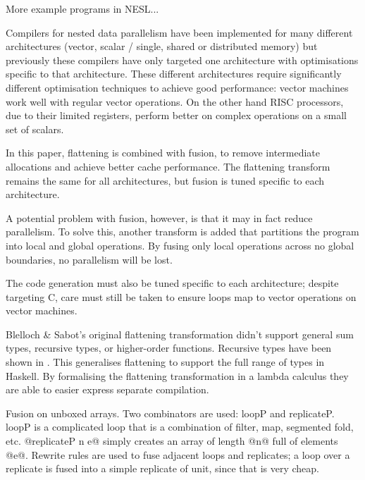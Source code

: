 More example programs in NESL...


Compilers for nested data parallelism have been implemented for many different architectures (vector, scalar / single, shared or distributed memory)
but previously these compilers have only targeted one architecture with optimisations specific to that architecture.
These different architectures require significantly different optimisation techniques to achieve good performance:
vector machines work well with regular vector operations.
On the other hand RISC processors, due to their limited registers,
perform better on complex operations on a small set of scalars.

In this paper, flattening is combined with fusion, to remove intermediate allocations and achieve better cache performance.
The flattening transform remains the same for all architectures, but fusion is tuned specific to each architecture.

A potential problem with fusion, however, is that it may in fact reduce parallelism. 
To solve this, another transform is added that partitions the program into local and global operations.
By fusing only local operations across no global boundaries, no parallelism will be lost.

The code generation must also be tuned specific to each architecture; despite targeting C,
care must still be taken to ensure loops map to vector operations on vector machines.


Blelloch \& Sabot's original flattening transformation didn't support general sum types, recursive types, or higher-order functions. Recursive types have been shown in \cite{keller1998flattening}.
This generalises flattening to support the full range of types in Haskell.
By formalising the flattening transformation in a lambda calculus they are able to easier express separate compilation.

Fusion on unboxed arrays. Two combinators are used: loopP and replicateP.
loopP is a complicated loop that is a combination of filter, map, segmented fold, etc.
@replicateP n e@ simply creates an array of length @n@ full of elements @e@.
Rewrite rules are used to fuse adjacent loops and replicates; a loop over a replicate is
fused into a simple replicate of unit, since that is very cheap.

